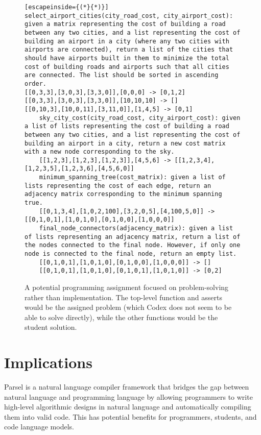\appendix
\renewcommand{\thefigure}{A.\arabic{figure}}
\setcounter{table}{0}  \renewcommand{\thetable}{A.\arabic{table}}

\onecolumn

\begin{figure*}[t]
\begin{lstlisting}[escapeinside={(*}{*)}]
select_airport_cities(city_road_cost, city_airport_cost): given a matrix representing the cost of building a road between any two cities, and a list representing the cost of building an airport in a city (where any two cities with airports are connected), return a list of the cities that should have airports built in them to minimize the total cost of building roads and airports such that all cities are connected. The list should be sorted in ascending order.
[[0,3,3],[3,0,3],[3,3,0]],[0,0,0] -> [0,1,2]
[[0,3,3],[3,0,3],[3,3,0]],[10,10,10] -> []
[[0,10,3],[10,0,11],[3,11,0]],[1,4,5] -> [0,1]
    sky_city_cost(city_road_cost, city_airport_cost): given a list of lists representing the cost of building a road between any two cities, and a list representing the cost of building an airport in a city, return a new cost matrix with a new node corresponding to the sky.
    [[1,2,3],[1,2,3],[1,2,3]],[4,5,6] -> [[1,2,3,4],[1,2,3,5],[1,2,3,6],[4,5,6,0]]
    minimum_spanning_tree(cost_matrix): given a list of lists representing the cost of each edge, return an adjacency matrix corresponding to the minimum spanning true.
    [[0,1,3,4],[1,0,2,100],[3,2,0,5],[4,100,5,0]] -> [[0,1,0,1],[1,0,1,0],[0,1,0,0],[1,0,0,0]]
    final_node_connectors(adjacency_matrix): given a list of lists representing an adjacency matrix, return a list of the nodes connected to the final node. However, if only one node is connected to the final node, return an empty list.
    [[0,1,0,1],[1,0,1,0],[0,1,0,0],[1,0,0,0]] -> []
    [[0,1,0,1],[1,0,1,0],[0,1,0,1],[1,0,1,0]] -> [0,2]
\end{lstlisting}
\vspace{-8px}
\caption{A potential programming assignment focused on problem-solving rather than implementation. The top-level function and asserts would be the assigned problem (which Codex \citep{chen2021evaluating} does not seem to be able to solve directly), while the other functions would be the student solution.}
\label{studentexample}
\vspace{-12px}
\end{figure*}
\section{Implications}
\label{implications}
Parsel is a natural language compiler framework that bridges the gap between natural language and programming language by allowing programmers to write high-level algorithmic designs in natural language and automatically compiling them into valid code. This has potential benefits for programmers, students, and code language models. 

